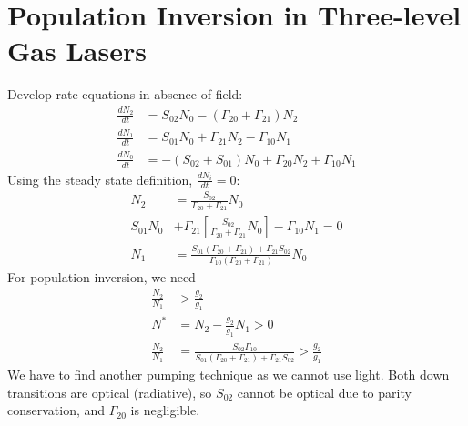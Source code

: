 \documentclass[a4paper, 11pt, normalem]{report}
\begin{document}
\chapter{Population Inversion in Three-level Gas Lasers}
\begin{figure}[H]
    \centering
\end{figure}
Develop rate equations in absence of field:
\begin{align}
    \frac{dN_2}{dt} &= S_{02}N_0 - (\Gamma_{20}+\Gamma_{21})N_2 \\
    \frac{dN_1}{dt} &= S_{01}N_0 + \Gamma_{21}N_2 - \Gamma_{10}N_1 \\
    \frac{dN_0}{dt} &= -(S_{02}+S_{01})N_0 + \Gamma_{20}N_2 + \Gamma_{10}N_1
\end{align}
Using the steady state definition, $\frac{dN_i}{dt}=0$:
\begin{align}
    N_2 &= \frac{S_{02}}{\Gamma_{20}+\Gamma_{21}}N_0 \\
    S_{01}N_0 &+ \Gamma_{21}\left[\frac{S_{02}}{\Gamma_{20}+\Gamma_{21}}N_0\right] - \Gamma_{10}N_1 = 0 \\
    N_1 &= \frac{S_{01}(\Gamma_{20}+\Gamma_{21})+\Gamma_{21}S_{02}}{\Gamma_{10}(\Gamma_{20}+\Gamma_{21})}N_0
\end{align}
For population inversion, we need
\begin{align}
    \frac{N_2}{N_1} &> \frac{g_2}{g_1} \\
    N^* &= N_2 - \frac{g_2}{g_1}N_1 > 0 \\
    \frac{N_2}{N_1} &= \frac{S_{02}\Gamma_{10}}{S_{01}(\Gamma_{20}+\Gamma_{21})+\Gamma_{21}S_{02}} > \frac{g_2}{g_1}
\end{align}
We have to find another pumping technique as we cannot use light.
Both down transitions are optical (radiative), so $S_{02}$ cannot be optical due to parity conservation, and $\Gamma_{20}$ is negligible.
\end{document}
